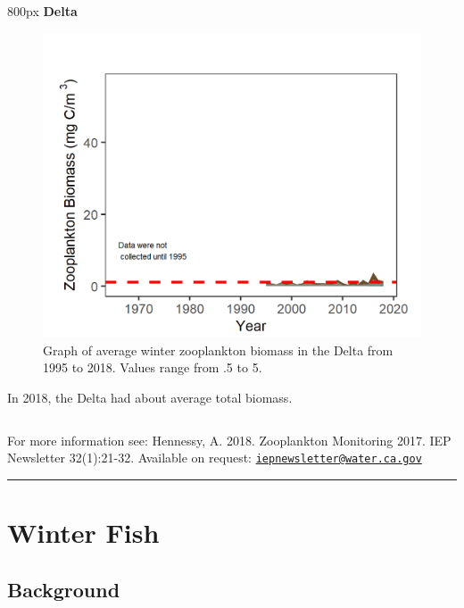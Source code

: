 \documentclass[
]{book}
\begin{document}
\begin{column}{800px\textwidth}
\textbf{Delta}

\begin{figure}
\includegraphics[width=15.25in]{figures/zoops_dtwinter} \caption{Graph of average winter zooplankton biomass in the Delta from 1995 to 2018. Values range from .5 to 5.}\label{fig:unnamed-chunk-167}
\end{figure}

In 2018, the Delta had about average total biomass.
\end{column}

\begin{disclaimer}
For more information see: Hennessy, A. 2018. Zooplankton Monitoring
2017. IEP Newsletter 32(1):21-32. Available on request:
\href{mailto:iepnewsletter@water.ca.gov}{\nolinkurl{iepnewsletter@water.ca.gov}}
\end{disclaimer}

\begin{center}\rule{0.5\linewidth}{0.5pt}\end{center}

\hypertarget{winter-fish}{%
\section{Winter Fish}\label{winter-fish}}

\hypertarget{background-22}{%
\subsection{Background}\label{background-22}}
\end{document}
